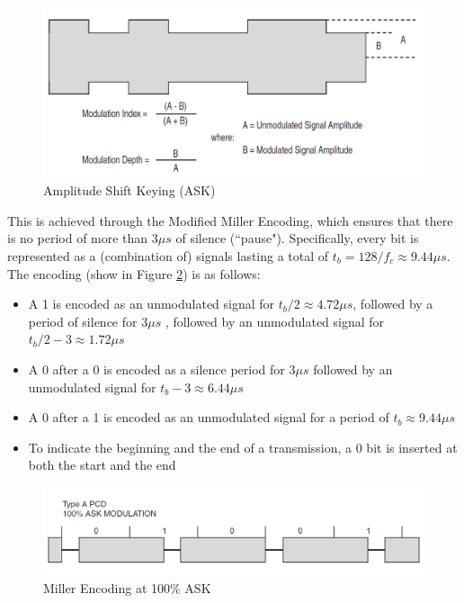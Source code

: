 \documentclass[fleqn,10pt]{SelfArx} %
\newcommand{\ms}{\ensuremath{\mu s} }
\begin{document}
\begin{figure}[h]
  \includegraphics[width=\linewidth]{img/ask}
  \caption{Amplitude Shift Keying (ASK) \cite{atmel}}
  \label{fig:ask}
\end{figure}

This is achieved through the Modified Miller Encoding, which ensures that there is no period of more than 3\ms of silence (``pause"). Specifically, every bit is represented as a (combination of) signals lasting a total of $t_b=128/f_c\approx9.44\ms$. The encoding (show in Figure \ref{fig:miller}) is as follows:
\begin{itemize}[noitemsep] 
\item A 1 is encoded as an unmodulated signal for $t_b/2\approx 4.72 \ms$, followed by a period of silence for 3\ms, followed by an unmodulated signal for $t_b/2-3\approx 1.72\ms$
\item A 0 after a 0 is encoded as a silence period for 3\ms followed by an unmodulated signal for $t_b-3\approx 6.44\ms$
\item A 0 after a 1 is encoded as an unmodulated signal for a period of $t_b\approx9.44\ms$
\item To indicate the beginning and the end of a transmission, a 0 bit is inserted at both the start and the end
\end{itemize}

\begin{figure}[h]
  \includegraphics[width=\linewidth]{img/miller}
  \caption{Miller Encoding at 100\% ASK \cite{atmel}}
  \label{fig:miller}
\end{figure}
\end{document}
